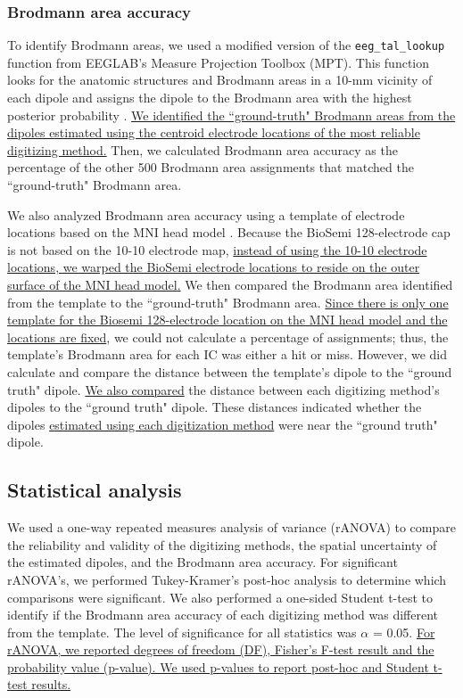 \documentclass[../thesis_seyed.tex]{subfiles}
\begin{document}
\subsubsection{Brodmann area accuracy}    
To identify Brodmann areas, we used a modified version of the {\tt \texttt{eeg\_tal\_lookup}} function from EEGLAB's Measure Projection Toolbox (MPT). This function looks for the anatomic structures and Brodmann areas in a 10-mm vicinity of each dipole and assigns the dipole to the Brodmann area with the highest posterior probability \cite{Bigdely-Shamlo2013-jv,Lancaster2000-aj}. \ul{We identified the ``ground-truth" Brodmann areas from the dipoles estimated using the centroid electrode locations of the most reliable digitizing method.} Then, we calculated Brodmann area accuracy as the percentage of the other 500 Brodmann area assignments that matched the ``ground-truth" Brodmann area. 

We also analyzed Brodmann area accuracy using a template of electrode locations based on the MNI head model \cite{Oostenveld2001-vg}. Because the BioSemi 128-electrode cap is not based on the 10-10 electrode map, \ul{instead of using the 10-10 electrode locations, we warped the BioSemi electrode locations to reside on the outer surface of the MNI head model.} We then compared the Brodmann area identified from the template to the ``ground-truth" Brodmann area. \ul{Since there is only one template for the Biosemi 128-electrode location on the MNI head model and the locations are fixed}, we could not calculate a percentage of assignments; thus, the template's Brodmann area for each IC was either a hit or miss. However, we did calculate and compare the distance between the template's dipole to the ``ground truth" dipole. \ul{We also compared} the distance between each digitizing method's dipoles to the ``ground truth" dipole. These distances indicated whether the dipoles \ul{estimated using each digitization method} were near the ``ground truth" dipole. 

\subsection{Statistical analysis}
We used a one-way repeated measures analysis of variance (rANOVA) to compare the reliability and validity of the digitizing methods, the spatial uncertainty of the estimated dipoles, and the Brodmann area accuracy. For significant rANOVA's, we performed Tukey-Kramer's post-hoc analysis to determine which comparisons were significant. We also performed a one-sided Student t-test to identify if the Brodmann area accuracy of each digitizing method was different from the template. The level of significance for all statistics was $\alpha$ = 0.05. \ul{For rANOVA, we reported degrees of freedom (DF), Fisher's F-test result and the probability value (p-value). We used p-values to report post-hoc and Student t-test results.} 
\end{document}
